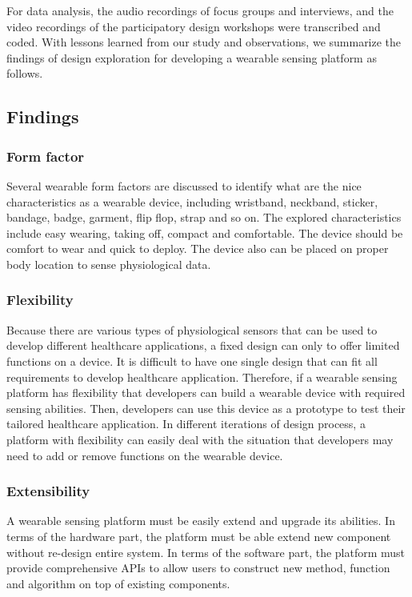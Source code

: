 For data analysis, the audio recordings of focus groups and interviews, and the video recordings of the participatory design workshops were transcribed and coded.
With lessons learned from our study and observations, we summarize the findings of design exploration for developing a wearable sensing platform as follows.

\subsection{Findings}
\subsubsection{Form factor}
Several wearable form factors are discussed to identify what are the nice characteristics as a wearable device, including wristband, neckband, sticker, bandage, badge, garment, flip flop, strap and so on. The explored characteristics include easy wearing, taking off, compact and comfortable. The device should be comfort to wear and quick to deploy. The device also can be placed on proper body location to sense physiological data.

\vspace{10pt}
\subsubsection{Flexibility}
Because there are various types of physiological sensors that can be used to develop different healthcare applications, a fixed design can only to offer limited functions on a device. It is difficult to have one single design that can fit all requirements to develop healthcare application. Therefore, if a wearable sensing platform has flexibility that developers can build a wearable device with required sensing abilities. Then, developers can use this device as a prototype to test their tailored healthcare application. In different iterations of design process, a platform with flexibility can easily deal with the situation that developers may need to add or remove functions on the wearable device.

\vspace{10pt}
\subsubsection{Extensibility}
A wearable sensing platform must be easily extend and upgrade its abilities. In terms of the hardware part, the platform must be able extend new component without re-design entire system. In terms of the software part, the platform must provide comprehensive APIs to allow users to construct new method, function and algorithm on top of existing components.

